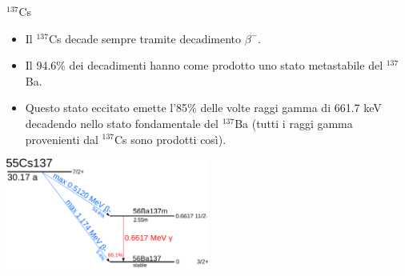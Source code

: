 \documentclass [xcolor=svgnames] {beamer}
\begin{document}
\begin{frame}{$^{137}$Cs}
	\begin{itemize}
		\item<1-> Il $^{137}$Cs decade sempre tramite decadimento $\beta^{-}$.
		\item<2-> Il 94.6\% dei decadimenti hanno come prodotto uno stato metastabile del $^{137}$Ba. 
		\item<3-> Questo stato eccitato emette l'85\% delle volte raggi gamma di 661.7 keV decadendo nello stato fondamentale del $^{137}$Ba (tutti i raggi gamma provenienti dal $^{137}$Cs sono prodotti così).
	\end{itemize}
	\centering
	\includegraphics[width=0.5\textwidth]{img/Cs-137-decay.png}
\end{frame}
\end{document}
